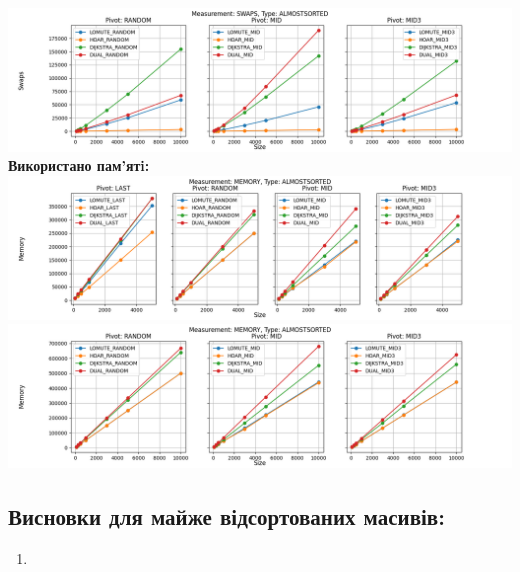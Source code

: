 \documentclass{article}
\begin{document}
        \includegraphics[scale=0.5]{almostsorted_Swaps_3_pivots_7_numbers.png}
        \newline
    \newpage
    \textbf{Використано пам’ятi:}
    \newline
        \includegraphics[scale=0.5]{almostsorted_Memory_6_numbers.png}
        \includegraphics[scale=0.5]{almostsorted_Memory_3_pivots_7_numbers.png}
    \subsection{Висновки для майже відсортованих масивів:}
    \begin{enumerate}
        \item 
    \end{enumerate}
    \newpage

\end{document}

